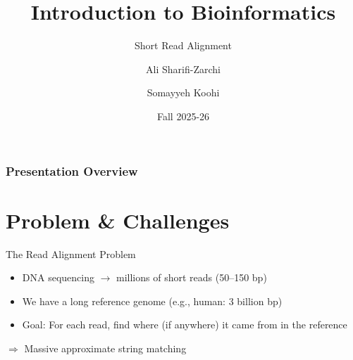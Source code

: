 \documentclass[
11pt, %
aspectratio=169, %
]{beamer}
\title[Introduction to Bioinformatics]{Introduction to Bioinformatics} %
\subtitle{Short Read Alignment} %
\author[Ali Sharifi-Zarchi \and Somayyeh Koohi]{Ali Sharifi-Zarchi \and Somayyeh Koohi} %
\institute[SUT]{CE Department \\ \smallskip \textit{Sharif University of Technology}}
\date[Fall 2025-26]{Fall 2025-26}
\begin{document}

\begin{frame}
	\titlepage %
\end{frame}



\begin{frame}
	\frametitle{Presentation Overview} %
	
	\tableofcontents %
\end{frame}




\section{Problem \& Challenges}
\begin{frame}{The Read Alignment Problem}
\begin{itemize}
\item DNA sequencing $\to$ millions of short reads (50--150 bp)
\item We have a long reference genome (e.g., human: 3 billion bp)
\bigskip
\item \alert{Goal}: For each read, find where (if anywhere) it came from in the reference
\end{itemize}
\vspace{1em}
\centerline{\Large $\Rightarrow$ Massive approximate string matching}
\end{frame}
\end{document}
